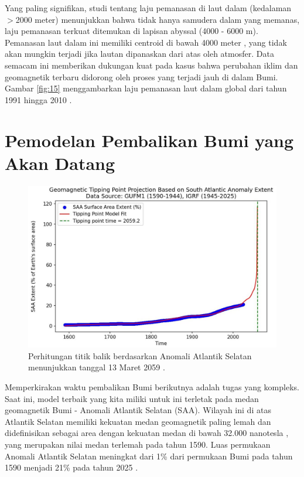 \documentclass[10pt,twocolumn,letterpaper]{article}
\begin{document}
Yang paling signifikan, studi tentang laju pemanasan di laut dalam (kedalaman $>$2000 meter) menunjukkan bahwa tidak hanya samudera dalam yang memanas, laju pemanasan terkuat ditemukan di lapisan abyssal (4000 - 6000 m). Pemanasan laut dalam ini memiliki centroid di bawah 4000 meter \cite{132,129}, yang tidak akan mungkin terjadi jika lautan dipanaskan dari atas oleh atmosfer. Data semacam ini memberikan dukungan kuat pada kasus bahwa perubahan iklim dan geomagnetik terbaru didorong oleh proses yang terjadi jauh di dalam Bumi. Gambar \ref{fig:15} menggambarkan laju pemanasan laut dalam global dari tahun 1991 hingga 2010 \cite{132}.

\section{Pemodelan Pembalikan Bumi yang Akan Datang}

\begin{figure}[t]
\begin{center}
   \includegraphics[width=1\linewidth]{saa-crop.jpeg}
\end{center}
   \caption{Perhitungan titik balik berdasarkan Anomali Atlantik Selatan menunjukkan tanggal 13 Maret 2059 \cite{125,126}.}
\label{fig:16}
\label{fig:onecol}
\end{figure}

Memperkirakan waktu pembalikan Bumi berikutnya adalah tugas yang kompleks. Saat ini, model terbaik yang kita miliki untuk ini terletak pada medan geomagnetik Bumi - Anomali Atlantik Selatan (SAA). Wilayah ini di atas Atlantik Selatan memiliki kekuatan medan geomagnetik paling lemah dan didefinisikan sebagai area dengan kekuatan medan di bawah 32.000 nanotesla \cite{135}, yang merupakan nilai medan terlemah pada tahun 1590. Luas permukaan Anomali Atlantik Selatan meningkat dari 1\% dari permukaan Bumi pada tahun 1590 menjadi 21\% pada tahun 2025 \cite{136}.
\end{document}
